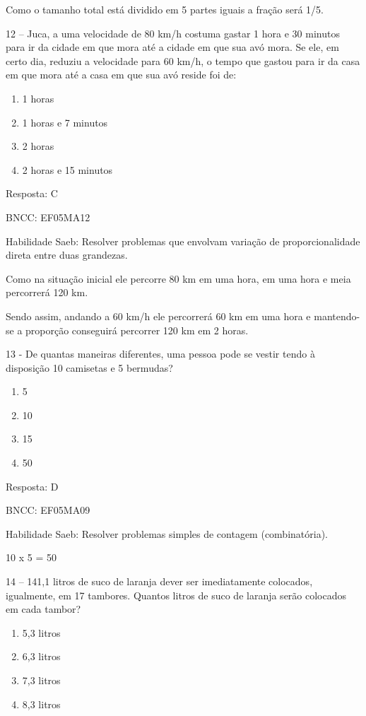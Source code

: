 Como o tamanho total está dividido em 5 partes iguais a fração será 1/5.

12 -- Juca, a uma velocidade de 80 km/h costuma gastar 1 hora e 30
minutos para ir da cidade em que mora até a cidade em que sua avó mora.
Se ele, em certo dia, reduziu a velocidade para 60 km/h, o tempo que
gastou para ir da casa em que mora até a casa em que sua avó reside foi
de:

\begin{enumerate}
\def\labelenumi{\alph{enumi})}
\item
  1 horas
\item
  1 horas e 7 minutos
\item
  2 horas
\item
  2 horas e 15 minutos
\end{enumerate}

Resposta: C

BNCC: EF05MA12

Habilidade Saeb: Resolver problemas que envolvam variação de
proporcionalidade direta entre duas grandezas.

Como na situação inicial ele percorre 80 km em uma hora, em uma hora e
meia percorrerá 120 km.

Sendo assim, andando a 60 km/h ele percorrerá 60 km em uma hora e
mantendo-se a proporção conseguirá percorrer 120 km em 2 horas.

13 - De quantas maneiras diferentes, uma pessoa pode se vestir tendo à
disposição 10 camisetas e 5 bermudas?

\begin{enumerate}
\def\labelenumi{\alph{enumi})}
\item
  5
\item
  10
\item
  15
\item
  50
\end{enumerate}

Resposta: D

BNCC: EF05MA09

Habilidade Saeb: Resolver problemas simples de contagem (combinatória).

10 x 5 = 50

14 -- 141,1 litros de suco de laranja dever ser imediatamente colocados,
igualmente, em 17 tambores. Quantos litros de suco de laranja serão
colocados em cada tambor?

\begin{enumerate}
\def\labelenumi{\alph{enumi})}
\item
  5,3 litros
\item
  6,3 litros
\item
  7,3 litros
\item
  8,3 litros
\end{enumerate}

